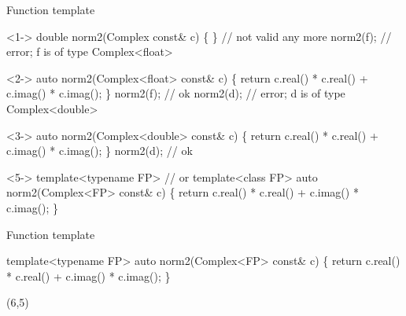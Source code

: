\begin{frame}[fragile]{Function template}

  \begin{codeblock}<1->{
double norm2(Complex const\& c) \{ \ddd \} // not valid any more
norm2(f);                             // error; f is of type Complex<float>}\end{codeblock}

  \begin{codeblock}<2->{
auto norm2(Complex<\alert<4-5>{float}> const\& c) \{
  return c.real() * c.real() + c.imag() * c.imag();
\}
norm2(f); // ok
norm2(d); // error; d is of type Complex<double>}\end{codeblock}

  \begin{codeblock}<3->{
auto norm2(Complex<\alert<4-5>{double}> const\& c) \{
  return c.real() * c.real() + c.imag() * c.imag();
\}
norm2(d); // ok}\end{codeblock}

  \begin{codeblock}<5->{
template<typename \alert<5>{FP}> // or template<class FP>
auto norm2(Complex<\alert<5>{FP}> const\& c) \{
  return c.real() * c.real() + c.imag() * c.imag();
\}
}\end{codeblock}

\end{frame}

\begin{frame}[fragile]{Function template \insertcontinuationtext}

  \begin{codeblock}
template<typename \alert<2>{FP}>
auto norm2(\alert<2>{Complex<FP>} const\& c)
\{ return c.real() * c.real() + c.imag() * c.imag(); \}



\end{codeblock}

  \begin{textblock}{6}(6,5)
  \end{textblock}

\end{frame}

